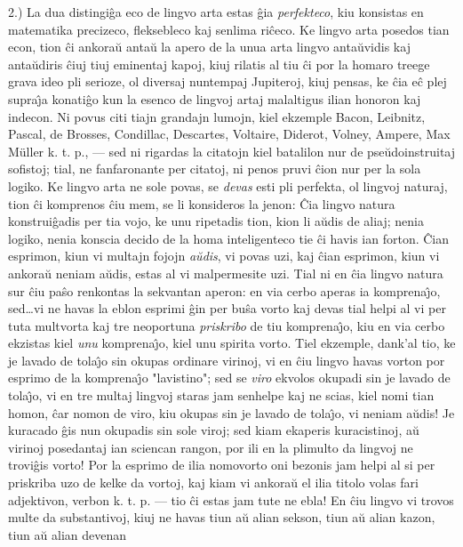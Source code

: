    2.) La dua distingi\^ga eco de lingvo arta estas \^gia {\sl perfekteco},
kiu konsistas en matematika precizeco, fleksebleco kaj senlima
ri\^ceco. Ke lingvo arta posedos tian econ, tion \^ci ankora\u u
anta\u u la apero de la unua arta lingvo anta\u uvidis kaj anta\u
udiris \^ciuj tiuj eminentaj kapoj, kiuj rilatis al tiu \^ci por la
homaro treege grava ideo pli serioze, ol diversaj nuntempaj
Jupiteroj, kiuj pensas, ke \^cia e\^c plej supra\^{\j}a konati\^go
kun la esenco de lingvoj artaj malaltigus ilian honoron kaj indecon.
Ni povus citi tiajn grandajn lumojn, kiel ekzemple Bacon, Leibnitz,
Pascal, de Brosses, Condillac, Descartes, Voltaire, Diderot, Volney,
Ampere, Max Müller k. t. p., --- sed ni rigardas la citatojn kiel
batalilon nur de pse\u udoinstruitaj sofistoj; tial, ne fanfaronante
per citatoj, ni penos pruvi \^cion nur per la sola logiko. Ke lingvo
arta ne sole povas, se {\sl devas} esti pli perfekta, ol lingvoj
naturaj, tion \^ci komprenos \^ciu mem, se li konsideros la jenon:
\^Cia lingvo natura konstrui\^gadis per tia vojo, ke unu ripetadis
tion, kion li a\u udis de aliaj; nenia logiko, nenia konscia decido
de la homa inteligenteco tie \^ci havis ian forton. \^Cian esprimon,
kiun vi multajn fojojn {\sl a\u udis}, vi povas uzi, kaj \^cian
esprimon, kiun vi ankora\u u neniam a\u udis, estas al vi
malpermesite uzi. Tial ni en \^cia lingvo natura sur \^ciu pa\^so
renkontas la sekvantan aperon: en via cerbo aperas ia
komprena\^{\j}o, sed\dots vi ne havas la eblon esprimi \^gin per
bu\^sa vorto kaj devas tial helpi al vi per tuta multvorta kaj tre
neoportuna {\sl priskribo} de tiu komprena\^{\j}o, kiu en via cerbo
ekzistas kiel {\sl unu} komprena\^{\j}o, kiel unu spirita vorto.
Tiel ekzemple, dank'al tio, ke je lavado de tola\^{\j}o sin okupas
ordinare virinoj, vi en \^ciu lingvo havas vorton por esprimo de la
komprena\^{\j}o "lavistino"; sed se {\sl viro} ekvolos okupadi sin
je lavado de tola\^{\j}o, vi en tre multaj lingvoj staras jam
senhelpe kaj ne scias, kiel nomi tian homon, \^car nomon de viro,
kiu okupas sin je lavado de tola\^{\j}o, vi neniam a\u udis! Je
kuracado \^gis nun okupadis sin sole viroj; sed kiam ekaperis
kuracistinoj, a\u u virinoj posedantaj ian sciencan rangon, por ili
en la plimulto da lingvoj ne trovi\^gis vorto! Por la esprimo de
ilia nomovorto oni bezonis jam helpi al si per priskriba uzo de
kelke da vortoj, kaj kiam vi ankora\u u el ilia titolo volas fari
adjektivon, verbon k. t. p. --- tio \^ci estas jam tute ne ebla! En
\^ciu lingvo vi trovos multe da substantivoj, kiuj ne havas tiun a\u
u alian sekson, tiun a\u u alian kazon, tiun a\u u alian devenan
